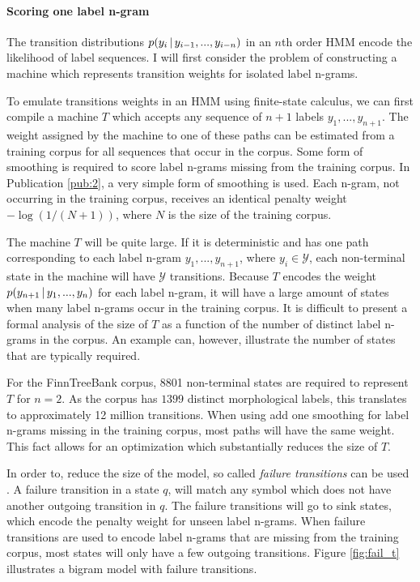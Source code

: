 \paragraph{Scoring one label n-gram} The transition distributions $p(y_i\mbox{$ \, | \, $}
y_{i - 1}, ..., y_{i - n})$ in an $n$th order HMM encode the likelihood of
label sequences. I will first consider the problem of constructing a
machine which represents transition weights for isolated label
n-grams. 

To emulate transitions weights in an HMM using finite-state calculus,
we can first compile a machine $T$ which accepts any sequence of $n+1$
labels $y_{1}, ..., y_{n+1}$. The weight assigned by the machine to
one of these paths can be estimated from a training corpus for all
sequences that occur in the corpus. Some form of smoothing is required
to score label n-grams missing from the training corpus. In
Publication \ref{pub:2}, a very simple form of smoothing is used. Each
n-gram, not occurring in the training corpus, receives an identical
penalty weight $-\log(1/(N+1))$, where $N$ is the size of the training
corpus. %


The machine $T$ will be quite large. If it is deterministic and has one path corresponding to
each label n-gram $y_1, ..., y_{n+1}$, where $y_i \in \mathcal{Y}$, each
non-terminal state in the machine will have $\mathcal{Y}$
transitions. Because $T$ encodes the weight $p(y_{n+1}\mbox{$ \, | \, $} y_{1},
..., y_{n})$ for each label n-gram, it will have a large amount of
states when many label n-grams occur in the training corpus. It is
difficult to present a formal analysis of the size of $T$ as a
function of the number of distinct label n-grams in the corpus. An
example can, however, illustrate the number of states that are
typically required.

For the FinnTreeBank corpus, 8801 non-terminal states are required to
represent $T$ for $n=2$. As the corpus has $1399$ distinct
morphological labels, this translates to approximately 12 million
transitions. When using add one smoothing for label n-grams missing in
the training corpus, most paths will have the same weight. This fact allows for an optimization which substantially reduces the size of $T$.

In order to, reduce the size of the model, so called {\it failure
  transitions} can be used \citep{someone}. A failure transition in a
state $q$, will match any symbol which does not have another outgoing
transition in $q$. The failure transitions will go to sink states,
which encode the penalty weight for unseen label n-grams. When failure
transitions are used to encode label n-grams that are missing from the
training corpus, most states will only have a few outgoing transitions.
Figure \ref{fig:fail_t} illustrates a bigram model with failure
transitions.

